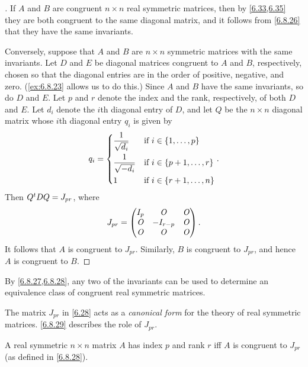 \begin{proof}[]
  If \(A\) and \(B\) are congruent \(n \times n\) real symmetric matrices, then by \cref{6.33,6.35} they are both congruent to the same diagonal matrix, and it follows from \cref{6.8.26} that they have the same invariants.

  Conversely, suppose that \(A\) and \(B\) are \(n \times n\) symmetric matrices with the same invariants.
  Let \(D\) and \(E\) be diagonal matrices congruent to \(A\) and \(B\), respectively, chosen so that the diagonal entries are in the order of positive, negative, and zero.
  (\cref{ex:6.8.23} allows us to do this.)
  Since \(A\) and \(B\) have the same invariants, so do \(D\) and \(E\).
  Let \(p\) and \(r\) denote the index and the rank, respectively, of both \(D\) and \(E\).
  Let \(d_i\) denote the \(i\)th diagonal entry of \(D\), and let \(Q\) be the \(n \times n\) diagonal matrix whose \(i\)th diagonal entry \(q_i\) is given by
  \[
    q_i = \begin{dcases}
      \dfrac{1}{\sqrt{d_i}}  & \text{if } i \in \left\lbrace1, \dots, p\right\rbrace     \\
      \dfrac{1}{\sqrt{-d_i}} & \text{if } i \in \left\lbrace p + 1, \dots, r\right\rbrace \\
      1                      & \text{if } i \in \left\lbrace r + 1, \dots, n\right\rbrace
    \end{dcases}.
  \]
  Then \({Q}^{t} D Q = J_{pr}\), where
  \[
    J_{pr} = \begin{pmatrix}
      I_p & \mathit{O}         & \mathit{O} \\
      \mathit{O} & - I_{r - p} & \mathit{O} \\
      \mathit{O} & \mathit{O}         & \mathit{O}
    \end{pmatrix}.
  \]
  It follows that \(A\) is congruent to \(J_{pr}\).
  Similarly, \(B\) is congruent to \(J_{pr}\), and hence \(A\) is congruent to \(B\).
\end{proof}

\begin{note}
  By \cref{6.8.27,6.8.28}, any two of the invariants can be used to determine an equivalence class of congruent real symmetric matrices.

  The matrix \(J_{pr}\) in \cref{6.28} acts as a \emph{canonical form} for the theory of real symmetric matrices.
  \cref{6.8.29} describes the role of \(J_{pr}\).
\end{note}

\begin{cor}\label{6.8.29}
  A real symmetric \(n \times n\) matrix \(A\) has index \(p\) and rank \(r\) iff \(A\) is congruent to \(J_{pr}\) (as defined in \cref{6.8.28}).
\end{cor}

